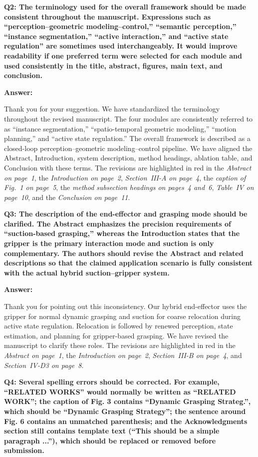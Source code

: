 \documentclass[journal,10pt]{IEEEtran}
\newcommand{\question}[2]{%
  \par\smallskip\noindent
  {\color{responseblue}\bfseries\clubpenalty=10000\widowpenalty=10000 Q#1: #2\par}%
  \par\nobreak\noindent
}
\newcommand{\answer}{%
  \par\smallskip\noindent
  \textbf{Answer: }\ignorespaces
}
\begin{document}
\question{2}{The terminology used for the overall framework should be made consistent throughout the manuscript. Expressions such as “perception–geometric modeling–control,” “semantic perception,” “instance segmentation,” “active interaction,” and “active state regulation” are sometimes used interchangeably. It would improve readability if one preferred term were selected for each module and used consistently in the title, abstract, figures, main text, and conclusion.}

\answer
Thank you for your suggestion. We have standardized the terminology throughout the revised manuscript. The four modules are consistently referred to as ``instance segmentation,'' ``spatio-temporal geometric modeling,'' ``motion planning,'' and ``active state regulation.'' The overall framework is described as a closed-loop perception--geometric modeling--control pipeline. We have aligned the Abstract, Introduction, system description, method headings, ablation table, and Conclusion with these terms. The revisions are highlighted in red in the \textit{Abstract on page~1}, the \textit{Introduction on page~2}, \textit{Section~III-A on page~4}, the \textit{caption of Fig.~1 on page~5}, the \textit{method subsection headings on pages~4 and~6}, \textit{Table~IV on page~10}, and the \textit{Conclusion on page~11}.

\question{3}{The description of the end-effector and grasping mode should be clarified. The Abstract emphasizes the precision requirements of “suction-based grasping,” whereas the Introduction states that the gripper is the primary interaction mode and suction is only complementary. The authors should revise the Abstract and related descriptions so that the claimed application scenario is fully consistent with the actual hybrid suction–gripper system.}

\answer
Thank you for pointing out this inconsistency. Our hybrid end-effector uses the gripper for normal dynamic grasping and suction for coarse relocation during active state regulation. Relocation is followed by renewed perception, state estimation, and planning for gripper-based grasping. We have revised the manuscript to clarify these roles. The revisions are highlighted in red in the \textit{Abstract on page~1}, the \textit{Introduction on page~2}, \textit{Section~III-B on page~4}, and \textit{Section~IV-D3 on page~8}.

\question{4}{Several spelling errors should be corrected. For example, “RELATED WORKS” would normally be written as “RELATED WORK”; the caption of Fig. 3 contains “Dynamic Grasping Strateg.”, which should be “Dynamic Grasping Strategy”; the sentence around Fig. 6 contains an unmatched parenthesis; and the Acknowledgments section still contains template text (“This should be a simple paragraph ...”), which should be replaced or removed before submission.}
\end{document}
